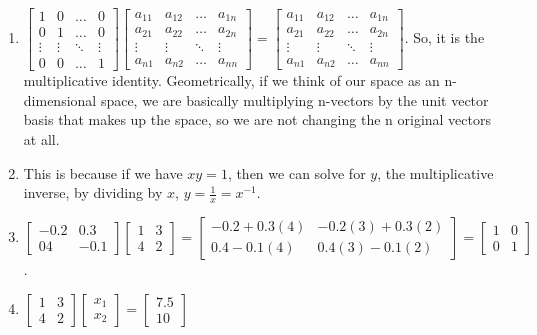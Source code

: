 \documentclass{article}
\begin{document}
\begin{enumerate}
	\item $
	\begin{bmatrix}
		1	&0	&\dots	&0\\
		0	&1	&\dots	&0\\
		\vdots	&\vdots	&\ddots	&\vdots\\
		0	&0	&\dots	&1
	\end{bmatrix}
	\begin{bmatrix}
		a_{11}	&a_{12}	&\dots	&a_{1n}\\
		a_{21}	&a_{22}	&\dots	&a_{2n}\\
		\vdots	&\vdots	&\ddots	&\vdots\\
		a_{n1}	&a_{n2}	&\dots	&a_{nn}	
	\end{bmatrix}
	= \begin{bmatrix}
		a_{11}	&a_{12}	&\dots	&a_{1n}\\
		a_{21}	&a_{22}	&\dots	&a_{2n}\\
		\vdots	&\vdots	&\ddots	&\vdots\\
		a_{n1}	&a_{n2}	&\dots	&a_{nn}			
	\end{bmatrix}
	$. So, it is the multiplicative identity. Geometrically, if we think of our space as an n-dimensional space, we are basically multiplying n-vectors by the unit vector basis that makes up the space, so we are not changing the n original vectors at all. 
	
	\item This is because if we have $xy = 1$, then we can solve for $y$, the multiplicative inverse, by dividing by $x$, $y = \frac{1}{x} = x^{-1}$. 
	
	\item $\begin{bmatrix}
		-0.2	&0.3\\
		04	&-0.1
	\end{bmatrix}
	\begin{bmatrix}
		1	&3\\
		4	&2
	\end{bmatrix}
	= 
	\begin{bmatrix}
		-0.2+0.3(4)	&-0.2(3)+0.3(2)\\
		0.4-0.1(4)		&0.4(3)-0.1(2)
	\end{bmatrix}
	=
	\begin{bmatrix}
		1	&0\\
		0	&1
	\end{bmatrix}
	$. 
	
	\item $
	\begin{bmatrix}
		1	&3\\
		4	&2
	\end{bmatrix}
	\begin{bmatrix}
		x_1\\
		x_2
	\end{bmatrix}
	= 
	\begin{bmatrix}
		7.5\\
		10
	\end{bmatrix}	
	$
	

\end{enumerate}
\end{document}
